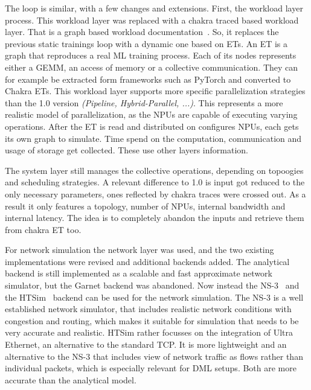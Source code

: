 The loop is similar, with a few changes and extensions.
First, the workload layer process. This workload layer was replaced with a chakra traced based workload layer. That is a graph based workload documentation~\cite{sridharan_chakra_2023}.
So, it replaces the previous static trainings loop with a dynamic one based on \acp{ET}. An \ac{ET} is a graph that reproduces a real \ac{ML} training process. Each of its nodes represents either a \ac{GEMM}, an access of memory or a collective communication. They can for example be extracted form frameworks such as PyTorch and converted to Chakra \acp{ET}.
This workload layer supports more specific parallelization strategies than the 1.0 version \textit{(Pipeline, Hybrid-Parallel, ...)}. %
This represents a more realistic model of parallelization, as the \acp{NPU} are capable of executing varying operations. 
After the \ac{ET} is read and distributed on configures \acp{NPU}, each gets its own graph to simulate. Time spend on the computation, communication and usage of storage get collected. These use other layers information.

The system layer still manages the collective operations, depending on topoogies and scheduling strategies. A relevant difference to 1.0 is input got reduced to the only necessary parameters, ones reflected by chakra traces were crossed out. As a result it only features a topology, number of \acp{NPU}, internal bandwidth and internal latency. %
The idea is to completely abandon the inputs and retrieve them from chakra \ac{ET} too.

For network simulation the network layer was used, and the two existing implementations were revised and additional backends added. 
The analytical backend is still implemented as a scalable and fast approximate network simulator, but the Garnet backend was abandoned.  
Now instead the \ac{NS-3}~\cite{riley_ns-3_2010} and the \ac{HTSim}~\cite{besta_towards_2021} backend can be used for the network simulation. 
The \ac{NS-3} is a well established network simulator, that includes realistic network conditions with congestion and routing, which makes it suitable for simulation that needs to be very accurate and realistic. \ac{HTSim} rather focusses on the integration of Ultra Ethernet, an alternative to the standard \ac{TCP}. It is more lightweight and an alternative to the \ac{NS-3} that includes view of network traffic as flows rather than individual packets, which is especially relevant for \ac{DML} setups.
Both are more accurate than the analytical model. %


